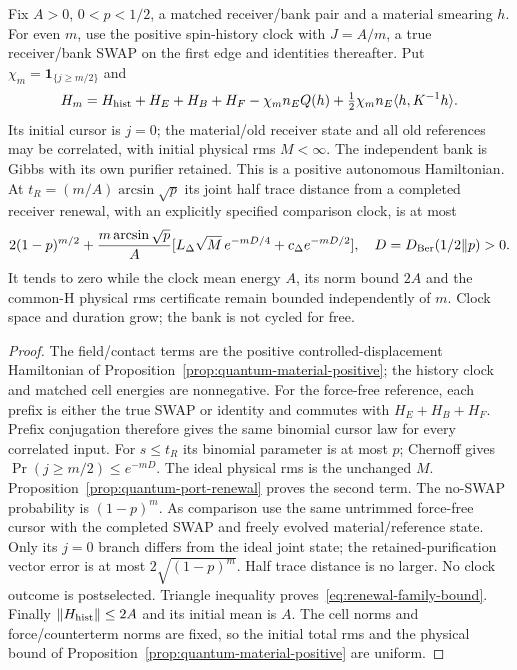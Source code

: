 \begin{corollary}
\label{cor:quantum-renewal-family}
Fix $A>0$, $0<p<1/2$, a matched receiver/bank pair and a material
smearing $h$. For even $m$, use the positive spin-history clock with
$J=A/m$, a true receiver/bank SWAP on the first edge and identities
thereafter. Put $\chi_m=\mathbf1_{\{j\ge m/2\}}$ and
\[
 H_m=H_{\rm hist}+H_E+H_B+H_F-\chi_m n_EQ(h)
       +\tfrac12\chi_m n_E\langle h,K^{-1}h\rangle .
\]
Its initial cursor is $j=0$; the material/old receiver state and all old
references may be correlated, with initial physical rms $M<\infty$.
The independent bank is Gibbs with its own purifier retained.
This is a positive autonomous Hamiltonian. At
$t_R=(m/A)\arcsin\sqrt p$ its joint half trace distance from a completed
receiver renewal, with an explicitly specified comparison clock, is at
most
\begin{equation}
 2(1-p)^{m/2}+\frac{m\arcsin\sqrt p}{A}
 [L_\Delta\sqrt M\,e^{-mD/4}+c_\Delta e^{-mD/2}],
 \quad D=D_{\rm Ber}(1/2\|p)>0 .
 \label{eq:renewal-family-bound}
\end{equation}
It tends to zero while the clock mean energy $A$, its norm bound $2A$
and the common-H physical rms certificate remain bounded independently
of $m$. Clock space and duration grow; the bank is not cycled for free.
\end{corollary}
\begin{proof}
The field/contact terms are the positive controlled-displacement
Hamiltonian of Proposition~\ref{prop:quantum-material-positive};
the history clock and matched cell energies are nonnegative.
For the force-free reference, each prefix is either the true SWAP or
identity and commutes with $H_E+H_B+H_F$. Prefix conjugation therefore
gives the same binomial cursor law for every correlated input.
For $s\le t_R$ its binomial parameter is at most $p$; Chernoff gives
$\Pr(j\ge m/2)\le e^{-mD}$. The ideal physical rms is the unchanged
$M$. Proposition~\ref{prop:quantum-port-renewal} proves the second term.
The no-SWAP probability is $(1-p)^m$.
As comparison use the same untrimmed force-free cursor with the
completed SWAP and freely evolved material/reference state.
Only its $j=0$ branch differs from the ideal joint state; the
retained-purification vector error is at most $2\sqrt{(1-p)^m}$.
Half trace distance is no larger. No clock outcome is postselected.
Triangle inequality proves~\eqref{eq:renewal-family-bound}.
Finally $\|H_{\rm hist}\|\le2A$ and its initial mean is $A$.
The cell norms and force/counterterm norms are fixed, so the initial
total rms and the physical bound of
Proposition~\ref{prop:quantum-material-positive} are uniform.
\end{proof}

